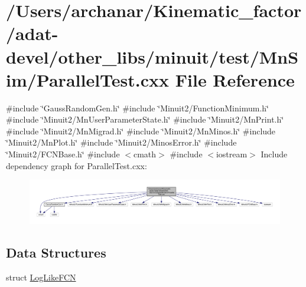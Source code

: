 \hypertarget{adat-devel_2other__libs_2minuit_2test_2MnSim_2ParallelTest_8cxx}{}\section{/\+Users/archanar/\+Kinematic\+\_\+factor/adat-\/devel/other\+\_\+libs/minuit/test/\+Mn\+Sim/\+Parallel\+Test.cxx File Reference}
\label{adat-devel_2other__libs_2minuit_2test_2MnSim_2ParallelTest_8cxx}
{\ttfamily \#include \char`\"{}Gauss\+Random\+Gen.\+h\char`\"{}}\newline
{\ttfamily \#include \char`\"{}Minuit2/\+Function\+Minimum.\+h\char`\"{}}\newline
{\ttfamily \#include \char`\"{}Minuit2/\+Mn\+User\+Parameter\+State.\+h\char`\"{}}\newline
{\ttfamily \#include \char`\"{}Minuit2/\+Mn\+Print.\+h\char`\"{}}\newline
{\ttfamily \#include \char`\"{}Minuit2/\+Mn\+Migrad.\+h\char`\"{}}\newline
{\ttfamily \#include \char`\"{}Minuit2/\+Mn\+Minos.\+h\char`\"{}}\newline
{\ttfamily \#include \char`\"{}Minuit2/\+Mn\+Plot.\+h\char`\"{}}\newline
{\ttfamily \#include \char`\"{}Minuit2/\+Minos\+Error.\+h\char`\"{}}\newline
{\ttfamily \#include \char`\"{}Minuit2/\+F\+C\+N\+Base.\+h\char`\"{}}\newline
{\ttfamily \#include $<$cmath$>$}\newline
{\ttfamily \#include $<$iostream$>$}\newline
Include dependency graph for Parallel\+Test.\+cxx\+:
\nopagebreak
\begin{figure}[H]
\begin{center}
\leavevmode
\includegraphics[width=350pt]{d1/d4e/adat-devel_2other__libs_2minuit_2test_2MnSim_2ParallelTest_8cxx__incl}
\end{center}
\end{figure}
\subsection*{Data Structures}
\begin{DoxyCompactItemize}
\item 
struct \mbox{\hyperlink{structLogLikeFCN}{Log\+Like\+F\+CN}}
\end{DoxyCompactItemize}
